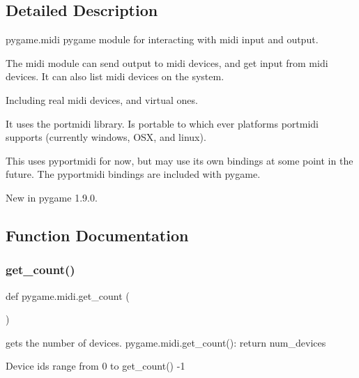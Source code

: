 \subsection{Detailed Description}
\begin{DoxyVerb}pygame.midi
pygame module for interacting with midi input and output.

The midi module can send output to midi devices, and get input
from midi devices.  It can also list midi devices on the system.

Including real midi devices, and virtual ones.

It uses the portmidi library.  Is portable to which ever platforms
portmidi supports (currently windows, OSX, and linux).

This uses pyportmidi for now, but may use its own bindings at some
point in the future.  The pyportmidi bindings are included with pygame.

New in pygame 1.9.0.
\end{DoxyVerb}
 

\subsection{Function Documentation}
\mbox{\label{namespacepygame_1_1midi_a1a222467ad7f6c7c51850bc961d56c16}} 
\subsubsection{\texorpdfstring{get\+\_\+count()}{get\_count()}}
{\footnotesize\ttfamily def pygame.\+midi.\+get\+\_\+count (\begin{DoxyParamCaption}{ }\end{DoxyParamCaption})}

\begin{DoxyVerb}gets the number of devices.
pygame.midi.get_count(): return num_devices


Device ids range from 0 to get_count() -1
\end{DoxyVerb}
 \mbox{\label{namespacepygame_1_1midi_a6b730b0fcba359aeb568488d5d23d733}} 
